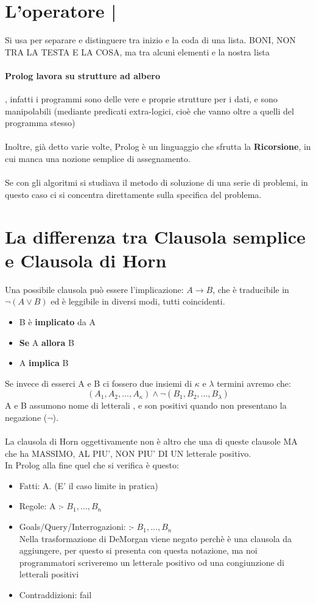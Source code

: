 \documentclass[12pt, a4paper, openany, oneside]{book}
\begin{document}
{\section{L'operatore | }
Si usa per separare e distinguere tra inizio e la coda di una lista. BONI, NON 
TRA LA TESTA E LA COSA, ma tra alcuni elementi e la nostra lista
\paragraph{Prolog lavora su strutture ad albero }, infatti i programmi sono delle
vere e proprie strutture per i dati, e sono manipolabili (mediante predicati
extra-logici, cioè che vanno oltre a quelli del programma stesso)
\\ \\
Inoltre, già detto varie volte, Prolog è un linguaggio che sfrutta la 
\textbf{Ricorsione}, in cui manca una nozione semplice di assegnamento.
\\ \\
Se con gli algoritmi si studiava il metodo di soluzione di una serie di problemi,
in questo caso ci si concentra direttamente sulla specifica del problema.
\section{La differenza tra Clausola semplice e Clausola di \color{red} Horn
\color{black}}
Una possibile clausola può essere l'implicazione: $A \to B$, che è traducibile
in $\neg(A \vee B)$ ed è leggibile in diversi modi, tutti coincidenti.
\begin{itemize}
	\item B è \textbf{implicato} da A
	\item \textbf{Se} A \textbf{allora} B
	\item A \textbf{implica} B
\end{itemize}
Se invece di esserci A e B ci fossero due insiemi di $\kappa$ e $\lambda$ 
termini avremo che:
\[
(A_{1}, A_{2}, ... ,A_{\kappa}) \wedge \neg(B_{1}, B_{2}, ... ,B_{\lambda})
\]
A e B assumono nome di \color{red} letterali \color{black}, e son positivi 
quando non presentano la negazione ($\neg$).
\\ \\
La clausola di Horn oggettivamente non è altro che una di queste clausole MA 
che ha MASSIMO, AL PIU', NON PIU' DI UN letterale positivo.
\\ 
In Prolog alla fine quel che si verifica è questo:
\begin{itemize}
	\item \color{red} Fatti:  \color{black} A. (E' il caso limite in pratica)
	\item \color{red} Regole: \color{black} A :- $B_{1}, ..., B_{n}$
	\item \color{red} Goals/Query/Interrogazioni:  \color{black} :- $B_{1}, ..., B_{n}$ \\
	Nella trasformazione di DeMorgan viene negato perchè è una clausola da 
	aggiungere, per questo si presenta con questa notazione, ma noi
	programmatori scriveremo un letterale positivo od una congiunzione di 
	letterali positivi
	\item \color{red} Contraddizioni: \color{black} fail
\end{itemize}
}
\end{document}
